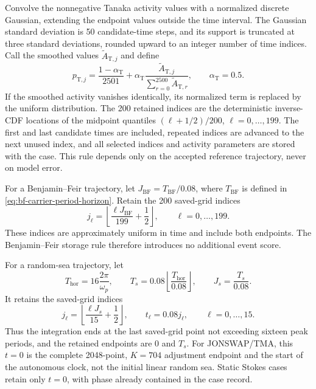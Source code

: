 \documentclass[11pt]{article}
\begin{document}
Convolve the nonnegative Tanaka activity values with a normalized discrete
Gaussian, extending the endpoint values outside the time interval.  The
Gaussian standard deviation is 50 candidate-time steps, and its support is
truncated at three standard deviations, rounded upward to an integer number
of time indices.  Call the smoothed values $\widetilde A_{\mathrm T,j}$ and
define
\begin{equation}
  p_{\mathrm T,j}=\frac{1-\alpha_{\mathrm T}}{2501}
    +\alpha_{\mathrm T}\frac{\widetilde A_{\mathrm T,j}}
      {\sum_{r=0}^{2500}\widetilde A_{\mathrm T,r}},
  \qquad \alpha_{\mathrm T}=0.5.
  \label{eq:adaptive-time-density}
\end{equation}
If the smoothed activity vanishes identically, its normalized term is replaced
by the uniform distribution.  The 200 retained indices are the deterministic
inverse-CDF locations of the midpoint quantiles
$(\ell+1/2)/200$, $\ell=0,\ldots,199$.  The first and last candidate times are
included, repeated indices are advanced to the next unused index, and all
selected indices and activity parameters are stored with the case.  This rule
depends only on the accepted reference trajectory, never on model error.

For a Benjamin--Feir trajectory, let
$J_{\mathrm{BF}}=T_{\mathrm{BF}}/0.08$, where $T_{\mathrm{BF}}$ is defined in
\eqref{eq:bf-carrier-period-horizon}.  Retain the 200 saved-grid indices
\begin{equation}
  j_\ell
  =\left\lfloor\frac{\ell J_{\mathrm{BF}}}{199}+\frac12\right\rfloor,
  \qquad \ell=0,\ldots,199.
  \label{eq:bf-uniform-time-selection}
\end{equation}
These indices are approximately uniform in time and include both endpoints.
The Benjamin--Feir storage rule therefore introduces no additional event
score.

For a random-sea trajectory, let
\[
  T_{\mathrm{hor}}=16\frac{2\pi}{\omega_p},
  \qquad
  T_s=0.08\left\lfloor\frac{T_{\mathrm{hor}}}{0.08}\right\rfloor,
  \qquad
  J_s=\frac{T_s}{0.08}.
\]
It retains the saved-grid indices
\[
  j_\ell=\left\lfloor\frac{\ell J_s}{15}+\frac12\right\rfloor,
  \qquad
  t_\ell=0.08j_\ell,
  \qquad \ell=0,\ldots,15.
\]
Thus the integration ends at the last saved-grid point not exceeding sixteen
peak periods, and the retained endpoints are $0$ and $T_s$.  For
JONSWAP/TMA, this \(t=0\) is the complete 2048-point, \(K=704\) adjustment endpoint and
the start of the autonomous clock, not the initial linear random sea.  Static
Stokes cases retain only $t=0$, with phase already contained in the case
record.
\end{document}
